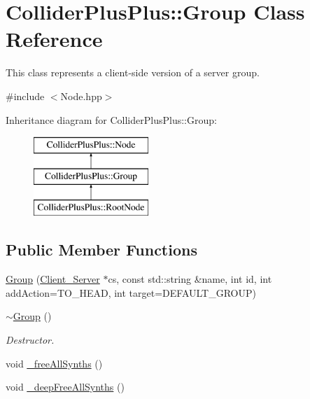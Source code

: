 \hypertarget{classColliderPlusPlus_1_1Group}{\section{Collider\-Plus\-Plus\-:\-:Group Class Reference}
\label{classColliderPlusPlus_1_1Group}
}


This class represents a client-\/side version of a server group.  




{\ttfamily \#include $<$Node.\-hpp$>$}

Inheritance diagram for Collider\-Plus\-Plus\-:\-:Group\-:\begin{figure}[H]
\begin{center}
\leavevmode
\includegraphics[height=3.000000cm]{classColliderPlusPlus_1_1Group}
\end{center}
\end{figure}
\subsection*{Public Member Functions}
\begin{DoxyCompactItemize}
\item 
\hyperlink{classColliderPlusPlus_1_1Group_ae6cc9c4e45c9e707387b3e9b52a3f0af}{Group} (\hyperlink{classColliderPlusPlus_1_1Client__Server}{Client\-\_\-\-Server} $\ast$cs, const std\-::string \&name, int id, int add\-Action=T\-O\-\_\-\-H\-E\-A\-D, int target=D\-E\-F\-A\-U\-L\-T\-\_\-\-G\-R\-O\-U\-P)
\item 
\hypertarget{classColliderPlusPlus_1_1Group_aa7f0bbd9db8735ee8dc5fdfc8c7239cf}{\hyperlink{classColliderPlusPlus_1_1Group_aa7f0bbd9db8735ee8dc5fdfc8c7239cf}{$\sim$\-Group} ()}\label{classColliderPlusPlus_1_1Group_aa7f0bbd9db8735ee8dc5fdfc8c7239cf}

\begin{DoxyCompactList}\small\item\em Destructor. \end{DoxyCompactList}\item 
void \hyperlink{classColliderPlusPlus_1_1Group_a9971a4ef8ee6a65dfcec9ee46bf10400}{\-\_\-free\-All\-Synths} ()
\item 
void \hyperlink{classColliderPlusPlus_1_1Group_a0f1d13c4e637eec0bc4f2baa8faeb5cb}{\-\_\-deep\-Free\-All\-Synths} ()
\end{DoxyCompactItemize}


